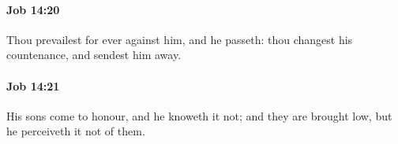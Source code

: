 		\paragraph{Job 14:20} %
			\label{JOB-14-20}

			Thou prevailest for ever against him, and he passeth: thou changest his countenance, and sendest him away.


		\paragraph{Job 14:21} %
			\label{JOB-14-21}

			His sons come to honour, and he knoweth it not; and they are brought low, but he perceiveth it not of them.


